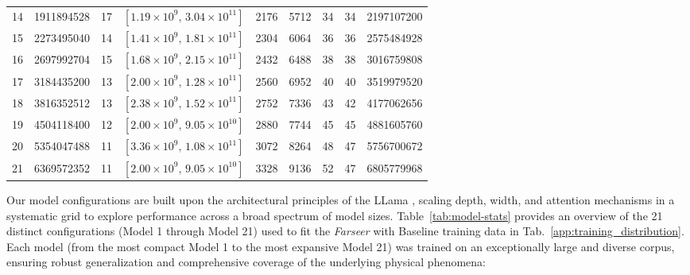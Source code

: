 \documentclass{article}
\begin{document}
\begin{table}[h!]
{\begin{tabular}{ccccccccc}
        14 & 1911894528  & 17 & $[1.19\times10^{9},\,3.04\times10^{11}]$   & 2176 & 5712 & 34 & 34 & 2197107200  \\
        15 & 2273495040  & 14 & $[1.41\times10^{9},\,1.81\times10^{11}]$   & 2304 & 6064 & 36 & 36 & 2575484928  \\
        16 & 2697992704  & 15 & $[1.68\times10^{9},\,2.15\times10^{11}]$   & 2432 & 6488 & 38 & 38 & 3016759808  \\
        17 & 3184435200  & 13 & $[2.00\times10^{9},\,1.28\times10^{11}]$   & 2560 & 6952 & 40 & 40 & 3519979520  \\
        18 & 3816352512  & 13 & $[2.38\times10^{9},\,1.52\times10^{11}]$   & 2752 & 7336 & 43 & 42 & 4177062656  \\
        19 & 4504118400  & 12 & $[2.00\times10^{9},\,9.05\times10^{10}]$   & 2880 & 7744 & 45 & 45 & 4881605760  \\
        20 & 5354047488  & 11 & $[3.36\times10^{9},\,1.08\times10^{11}]$   & 3072 & 8264 & 48 & 47 & 5756700672  \\
        21 & 6369572352  & 11 & $[2.00\times10^{9},\,9.05\times10^{10}]$   & 3328 & 9136 & 52 & 47 & 6805779968  \\
        \bottomrule
    \end{tabular}%
    }
\end{table}

\noindent Our model configurations are built upon the architectural principles of the LLama \cite{Touvron2023a,Touvron2023b}, scaling depth, width, and attention mechanisms in a systematic grid to explore performance across a broad spectrum of model sizes. Table~\ref{tab:model-stats} provides an overview of the 21 distinct configurations (Model 1 through Model 21) used to fit the \textit{Farseer} with Baseline training data in Tab.~\ref{app:training_distribution}. Each model (from the most compact Model 1 to the most expansive Model 21) was trained on an exceptionally large and diverse corpus, ensuring robust generalization and comprehensive coverage of the underlying physical phenomena:
\end{document}

